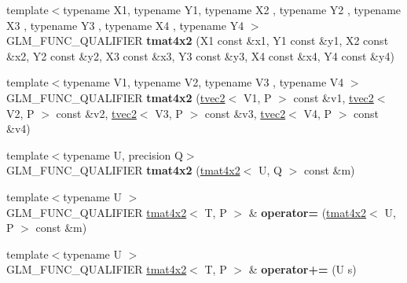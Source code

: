 \begin{DoxyCompactItemize}
\item 
{\footnotesize template$<$typename X1, typename Y1, typename X2 , typename Y2 , typename X3 , typename Y3 , typename X4 , typename Y4 $>$ }\\G\+L\+M\+\_\+\+F\+U\+N\+C\+\_\+\+Q\+U\+A\+L\+I\+F\+I\+ER {\bfseries tmat4x2} (X1 const \&x1, Y1 const \&y1, X2 const \&x2, Y2 const \&y2, X3 const \&x3, Y3 const \&y3, X4 const \&x4, Y4 const \&y4)\hypertarget{structglm_1_1detail_1_1tmat4x2_a0c0478eabc7a5766b287d58338d16ea2}{}\label{structglm_1_1detail_1_1tmat4x2_a0c0478eabc7a5766b287d58338d16ea2}

\item 
{\footnotesize template$<$typename V1, typename V2, typename V3 , typename V4 $>$ }\\G\+L\+M\+\_\+\+F\+U\+N\+C\+\_\+\+Q\+U\+A\+L\+I\+F\+I\+ER {\bfseries tmat4x2} (\hyperlink{structglm_1_1detail_1_1tvec2}{tvec2}$<$ V1, P $>$ const \&v1, \hyperlink{structglm_1_1detail_1_1tvec2}{tvec2}$<$ V2, P $>$ const \&v2, \hyperlink{structglm_1_1detail_1_1tvec2}{tvec2}$<$ V3, P $>$ const \&v3, \hyperlink{structglm_1_1detail_1_1tvec2}{tvec2}$<$ V4, P $>$ const \&v4)\hypertarget{structglm_1_1detail_1_1tmat4x2_a0d9b0f653d1eb4999d09d71bc0e455f7}{}\label{structglm_1_1detail_1_1tmat4x2_a0d9b0f653d1eb4999d09d71bc0e455f7}

\item 
{\footnotesize template$<$typename U, precision Q$>$ }\\G\+L\+M\+\_\+\+F\+U\+N\+C\+\_\+\+Q\+U\+A\+L\+I\+F\+I\+ER {\bfseries tmat4x2} (\hyperlink{structglm_1_1detail_1_1tmat4x2}{tmat4x2}$<$ U, Q $>$ const \&m)\hypertarget{structglm_1_1detail_1_1tmat4x2_a81ca48dabefc74d85c49880c33f0f6e5}{}\label{structglm_1_1detail_1_1tmat4x2_a81ca48dabefc74d85c49880c33f0f6e5}

\item 
{\footnotesize template$<$typename U $>$ }\\G\+L\+M\+\_\+\+F\+U\+N\+C\+\_\+\+Q\+U\+A\+L\+I\+F\+I\+ER \hyperlink{structglm_1_1detail_1_1tmat4x2}{tmat4x2}$<$ T, P $>$ \& {\bfseries operator=} (\hyperlink{structglm_1_1detail_1_1tmat4x2}{tmat4x2}$<$ U, P $>$ const \&m)\hypertarget{structglm_1_1detail_1_1tmat4x2_a2944e0d88d5337848dc71a591f6769e4}{}\label{structglm_1_1detail_1_1tmat4x2_a2944e0d88d5337848dc71a591f6769e4}

\item 
{\footnotesize template$<$typename U $>$ }\\G\+L\+M\+\_\+\+F\+U\+N\+C\+\_\+\+Q\+U\+A\+L\+I\+F\+I\+ER \hyperlink{structglm_1_1detail_1_1tmat4x2}{tmat4x2}$<$ T, P $>$ \& {\bfseries operator+=} (U s)\hypertarget{structglm_1_1detail_1_1tmat4x2_a9512b9a0aa009befd7905ab1ecbb966c}{}\label{structglm_1_1detail_1_1tmat4x2_a9512b9a0aa009befd7905ab1ecbb966c}


\end{DoxyCompactItemize}
